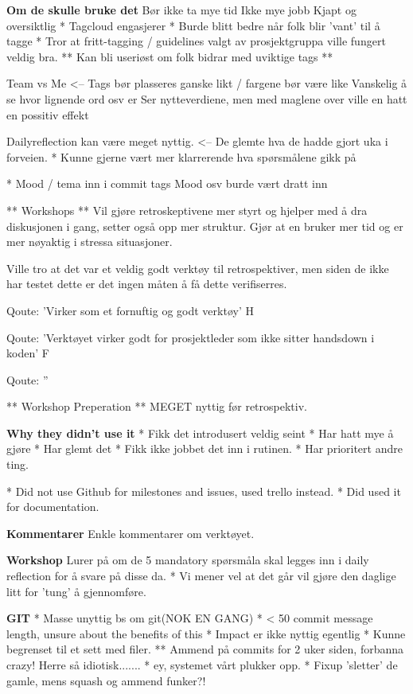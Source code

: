 
\textbf{Om de skulle bruke det}
Bør ikke ta mye tid
Ikke mye jobb
Kjapt og oversiktlig
 * Tagcloud engasjerer
 * Burde blitt bedre når folk blir 'vant' til å tagge
 * Tror at fritt-tagging / guidelines valgt av prosjektgruppa ville fungert veldig bra.
 ** Kan bli useriøst om folk bidrar med uviktige tags ** 

 Team vs Me <-- Tags bør plasseres ganske likt / fargene bør være like
				Vanskelig å se hvor lignende ord osv er
				Ser nytteverdiene, men med maglene over ville en hatt en possitiv effekt

Dailyreflection kan være meget nyttig. <-- De glemte hva de hadde gjort uka i forveien.
	* Kunne gjerne vært mer klarrerende hva spørsmålene gikk på


 * Mood / tema inn i commit tags
 Mood osv burde vært dratt inn

 ** Workshops **
 Vil gjøre retroskeptivene mer styrt og hjelper med å dra diskusjonen i gang, setter også opp mer struktur.
 Gjør at en bruker mer tid og er mer nøyaktig i stressa situasjoner.

 Ville tro at det var et veldig godt verktøy til retrospektiver, men siden de ikke har testet dette er det ingen måten å få dette verifiserres.
 
 Qoute: 'Virker som et fornuftig og godt verktøy' H

 Qoute: 'Verktøyet virker godt for prosjektleder som ikke sitter handsdown i koden' F

 Qoute: ''

** Workshop Preperation **
 MEGET nyttig før retrospektiv.

\textbf{Why they didn't use it}
* Fikk det introdusert veldig seint
	* Har hatt mye å gjøre
	* Har glemt det
* Fikk ikke jobbet det inn i rutinen.
* Har prioritert andre ting.


* Did not use Github for milestones and issues, used trello instead.
	* Did used it for documentation.

\textbf{Kommentarer}
Enkle kommentarer om verktøyet.

\textbf{Workshop}
Lurer på om de 5 mandatory spørsmåla skal legges inn i daily reflection for å svare på disse da.
	* Vi mener vel at det går vil gjøre den daglige litt for 'tung' å gjennomføre.


\textbf{GIT}
* Masse unyttig bs om git(NOK EN GANG)
* < 50 commit message length, unsure about the benefits of this
* Impact er ikke nyttig egentlig
	* Kunne begrenset til et sett med filer.
	** Ammend på commits for 2 uker siden, forbanna crazy! Herre så idiotisk.......
		* ey, systemet vårt plukker opp.
* Fixup 'sletter' de gamle, mens squash og ammend funker?!

